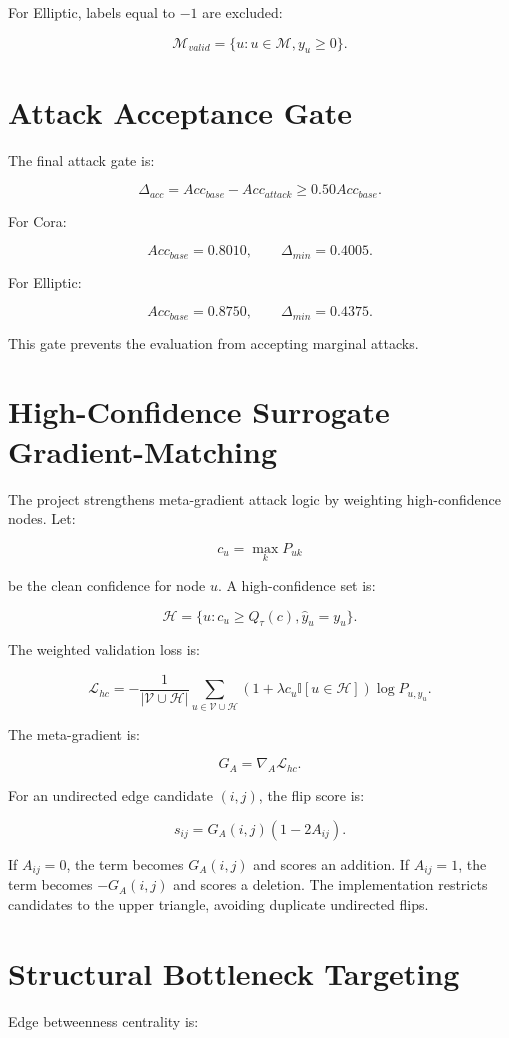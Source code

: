 \documentclass[12pt,oneside]{report}
\begin{document}
For Elliptic, labels equal to $-1$ are excluded:

$$
\mathcal{M}_{valid}=\{u:u\in\mathcal{M},y_u\geq0\}.
$$

\section{Attack Acceptance Gate}
The final attack gate is:

$$
\Delta_{acc}=Acc_{base}-Acc_{attack}\geq0.50Acc_{base}.
$$

For Cora:

$$
Acc_{base}=0.8010,\qquad \Delta_{min}=0.4005.
$$

For Elliptic:

$$
Acc_{base}=0.8750,\qquad \Delta_{min}=0.4375.
$$

This gate prevents the evaluation from accepting marginal attacks.

\section{High-Confidence Surrogate Gradient-Matching}
The project strengthens meta-gradient attack logic by weighting high-confidence nodes. Let:

$$
c_u=\max_{k}P_{uk}
$$

be the clean confidence for node $u$. A high-confidence set is:

$$
\mathcal{H}=\{u:c_u\geq Q_{\tau}(c),\hat{y}_u=y_u\}.
$$

The weighted validation loss is:

$$
\mathcal{L}_{hc}=-\frac{1}{|\mathcal{V}\cup\mathcal{H}|}\sum_{u\in\mathcal{V}\cup\mathcal{H}}(1+\lambda c_u\mathbb{I}[u\in\mathcal{H}])\log P_{u,y_u}.
$$

The meta-gradient is:

$$
G_A=\nabla_A \mathcal{L}_{hc}.
$$

For an undirected edge candidate $(i,j)$, the flip score is:

$$
s_{ij}=G_A(i,j)(1-2A_{ij}).
$$

If $A_{ij}=0$, the term becomes $G_A(i,j)$ and scores an addition. If $A_{ij}=1$, the term becomes $-G_A(i,j)$ and scores a deletion. The implementation restricts candidates to the upper triangle, avoiding duplicate undirected flips.

\section{Structural Bottleneck Targeting}
Edge betweenness centrality is:
\end{document}
